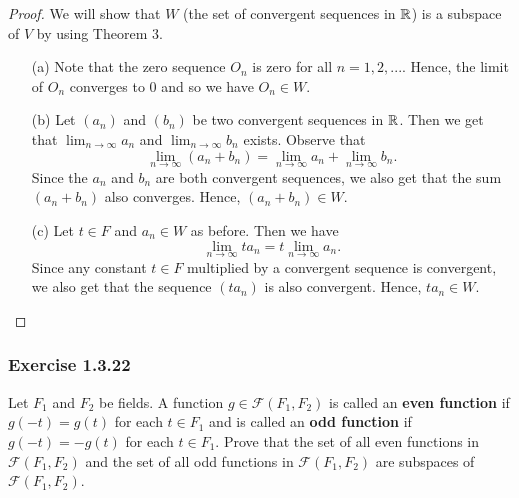\begin{proof}
We will show that \( W  \) (the set of convergent sequences in \( \mathbb{R}  \)) is a subspace of  \( V  \) by using Theorem 3.
\begin{enumerate}
    \item[(a)] Note that the zero sequence \( O_{n}   \)  is zero for all \( n = 1,2,... \). Hence, the limit of \( O_{n}  \) converges to \( 0  \) and so we have \( O_{n} \in W  \).
    \item[(b)] Let \( (a_{n})  \) and \( (b_{n}) \) be two convergent sequences in \( \mathbb{R}  \). Then we get that \( \lim_{ n \to \infty  }  a_{n}  \) and \( \lim_{ n \to \infty  }  b_{n} \) exists. Observe that 
        \[  \lim_{ n \to \infty  }  (a_{n} + b_{n}) = \lim_{ n \to \infty  }  a_{n} + \lim_{ n \to \infty  }  b_{n}.  \]
        Since the \( a_{n}  \) and \( b_{n}  \) are both convergent sequences, we also get that the sum \( (a_{n} + b_{n}) \) also converges. Hence, \( (a_{n} + b_{n} ) \in W  \).
    \item[(c)] Let \( t \in F  \) and \( a_{n} \in W \) as before. Then we have 
        \[  \lim_{ n \to \infty  }  ta_{n} = t \lim_{ n \to \infty  }  a_{n}. \] Since any constant \( t \in F  \) multiplied by a convergent sequence is convergent, we also get that the sequence \( (ta_{n})  \) is also convergent. Hence, \( ta_{n} \in W  \).
\end{enumerate}
\end{proof}


\subsubsection{Exercise 1.3.22} Let \( F_{1}  \) and \( F_{2}  \) be fields. A function \( g \in \mathcal{F} (F_{1}, F_{2} )  \) is called an \textbf{even function} if \( g(-t) = g(t)  \) for each \( t \in F_{1}  \) and is called an \textbf{odd function} if \( g(-t) = -g(t)  \) for each \( t \in F_{1}  \). Prove that the set of all even functions in \( \mathcal{F}(F_{1} , F_{2})  \) and the set of all odd functions in \( \mathcal{F}(F_{1}, F_{2})  \) are subspaces of \( \mathcal{F}(F_{1} , F_{2}) \).

